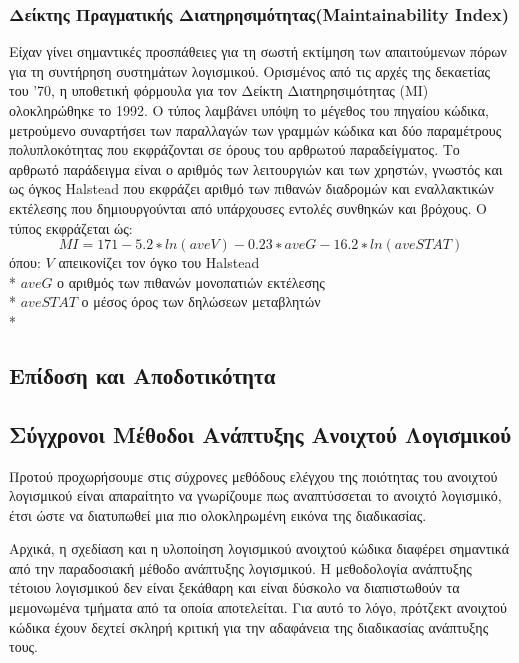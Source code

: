 \documentclass[a4paper, 11pt]{article}
\begin{document}
{{\subsubsection{Δείκτης Πραγματικής Διατηρησιμότητας(\textlatin{Maintainability Index})}
Είχαν γίνει σημαντικές προσπάθειες για τη σωστή εκτίμηση των απαιτούμενων
πόρων για τη συντήρηση συστημάτων λογισμικού. Ορισμένος από τις αρχές της δεκαετίας του '70, η
υποθετική φόρμουλα για τον Δείκτη Διατηρησιμότητας (MI) ολοκληρώθηκε το 1992. Ο τύπος λαμβάνει υπόψη το μέγεθος του πηγαίου κώδικα, μετρούμενο συναρτήσει
των παραλλαγών των γραμμών κώδικα και δύο παραμέτρους πολυπλοκότητας που εκφράζονται σε
όρους του αρθρωτού παραδείγματος. Το αρθρωτό παράδειγμα είναι ο αριθμός των λειτουργιών και των χρηστών, γνωστός και ως όγκος \textlatin{Halstead} που εκφράζει αριθμό των πιθανών διαδρομών και εναλλακτικών εκτέλεσης που δημιουργούνται από υπάρχουσες εντολές συνθηκών και βρόχους.
Ο τύπος εκφράζεται ώς:
\[M I = 171 − 5.2 ∗ ln(aveV ) − 0.23 ∗ aveG − 16.2 ∗ ln(aveST AT )\] όπου:  \(V\) απεικονίζει τον όγκο του \textlatin{Halstead}\\*
\(aveG\) ο αριθμός των πιθανών μονοπατιών εκτέλεσης\\*
\(aveSTAT\) ο μέσος όρος των δηλώσεων μεταβλητών\\*





\subsection{Επίδοση και Αποδοτικότητα}

\subsection{Σύγχρονοι Μέθοδοι Ανάπτυξης Ανοιχτού Λογισμικού}

Προτού προχωρήσουμε στις σύχρονες μεθόδους ελέγχου της ποιότητας του ανοιχτού λογισμικού είναι απαραίτητο να γνωρίζουμε πως αναπτύσσεται το ανοιχτό λογισμικό, έτσι ώστε να διατυπωθεί μια πιο ολοκληρωμένη εικόνα της διαδικασίας.

Αρχικά, η σχεδίαση και η υλοποίηση λογισμικού ανοιχτού κώδικα διαφέρει σημαντικά από την παραδοσιακή μέθοδο ανάπτυξης λογισμικού. Η μεθοδολογία ανάπτυξης τέτοιου λογισμικού δεν είναι ξεκάθαρη και είναι δύσκολο να διαπιστωθούν τα μεμονωμένα τμήματα από τα οποία αποτελείται. Για αυτό το λόγο, πρότζεκτ ανοιχτού κώδικα έχουν δεχτεί σκληρή κριτική για την αδαφάνεια της διαδικασίας ανάπτυξης τους.

}}
\end{document}
